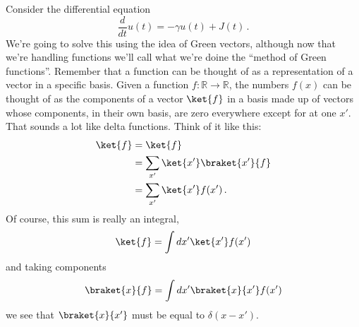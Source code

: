 


Consider the differential equation
\begin{equation}
  \frac{d}{dt} u(t) = - \gamma u(t) + J(t)
  \, .
\end{equation}
We're going to solve this using the idea of Green vectors, although now that we're handling functions we'll call what we're doine the ``method of Green functions''.
Remember that a function can be thought of as a representation of a vector in a specific basis.
Given a function $f:\mathbb{R} \rightarrow \mathbb{R}$, the numbers $f(x)$ can be thought of as the components of a vector $\ket{f}$ in a basis made up of vectors whose components, in their own basis, are zero everywhere except for at one $x'$.
That sounds a lot like delta functions.
Think of it like this:
\begin{align*}
  \ket{f} &= \ket{f} \\
  &= \sum_{x'} \ket{x'}\braket{x'}{f} \\
  &= \sum_{x'} \ket{x'} f(x')
  \, .
\end{align*}
Of course, this sum is really an integral,
\begin{equation}
  \ket{f} = \int dx' \ket{x'} f(x')
\end{equation}
and taking components
\begin{equation}
  \braket{x}{f} = \int dx' \braket{x}{x'} f(x')
\end{equation}
we see that $\braket{x}{x'}$ must be equal to $\delta(x - x')$.

